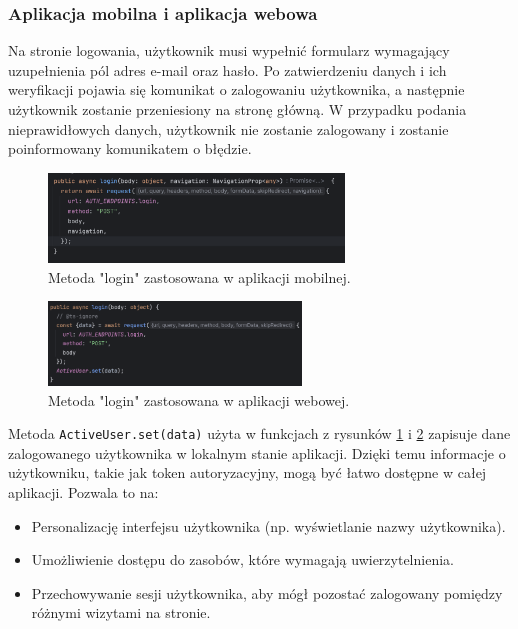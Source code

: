 \subsubsection{Aplikacja mobilna i aplikacja webowa}
Na stronie logowania, użytkownik musi wypełnić formularz wymagający uzupełnienia pól adres e-mail oraz hasło. Po zatwierdzeniu danych i ich weryfikacji pojawia się komunikat o zalogowaniu użytkownika, a następnie użytkownik zostanie przeniesiony na stronę główną. W przypadku podania nieprawidłowych danych, użytkownik nie zostanie zalogowany i zostanie poinformowany komunikatem o błędzie.

\begin{figure}[H]
    \centering
    \includegraphics[width=0.7\textwidth]{chapters/chapter_8/screens/logowanie_mobile}
    \caption{Metoda "login" zastosowana w aplikacji mobilnej.}
    \label{img:logowanie_mobile}
\end{figure}

\begin{figure}[H]
    \centering
    \includegraphics[width=0.6\textwidth]{chapters/chapter_8/screens/logowanie_web}
    \caption{Metoda "login" zastosowana w aplikacji webowej.}
    \label{img:logowanie_web}
\end{figure}

Metoda \texttt{ActiveUser.set(data)} użyta w funkcjach z rysunków \ref{img:logowanie_mobile} i \ref{img:logowanie_web} zapisuje dane zalogowanego użytkownika w lokalnym stanie aplikacji. Dzięki temu informacje o użytkowniku, takie jak token autoryzacyjny, mogą być łatwo dostępne w całej aplikacji. Pozwala to na:
\begin{itemize}
    \item Personalizację interfejsu użytkownika (np. wyświetlanie nazwy użytkownika).
    \item Umożliwienie dostępu do zasobów, które wymagają uwierzytelnienia.
    \item Przechowywanie sesji użytkownika, aby mógł pozostać zalogowany pomiędzy różnymi wizytami na stronie.
\end{itemize}

